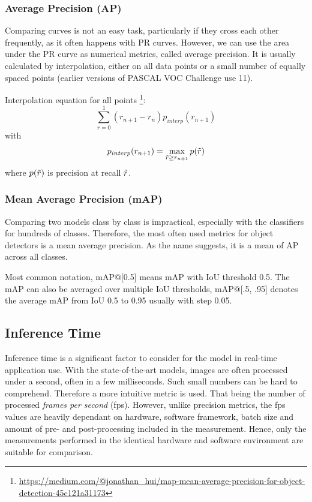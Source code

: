 \subsubsection{Average Precision (AP)}
Comparing curves is not an easy task, particularly if they cross each other frequently, as it often happens with PR curves. However, we can use the area under the PR curve as numerical metrics, called average precision. It is usually calculated by interpolation, either on all data points or a small number of equally spaced points (earlier versions of PASCAL VOC Challenge use 11).

Interpolation equation for all points \footnote{\url{https://medium.com/@jonathan\_hui/map-mean-average-precision-for-object-detection-45c121a31173}}:
$$\sum_{r=0}^1 (r_{n+1} - r_n ) p_{interp}(r_{n+1})$$
with
$$p_{interp}(r_{n+1}) = \max_{\Tilde{r} \geq r_{n+1}} p(\Tilde{r})$$
where $p(\Tilde{r})$ is precision at recall $\Tilde{r}$.

\subsubsection{Mean Average Precision (mAP)}
Comparing two models class by class is impractical, especially with the classifiers for hundreds of classes. Therefore, the most often used metrics for object detectors is a mean average precision. As the name suggests, it is a mean of AP across all classes.

Most common notation, mAP@[0.5] means mAP with IoU threshold 0.5. The mAP can also be averaged over multiple IoU thresholds, mAP@[.5, .95] denotes the average mAP from IoU 0.5 to 0.95 usually with step 0.05.

\subsection{Inference Time}
Inference time is a significant factor to consider for the model in real-time application use. With the state-of-the-art models, images are often processed under a second, often in a few milliseconds. Such small numbers can be hard to comprehend. Therefore a more intuitive metric is used. That being the number of processed \textit{frames per second} (fps). However, unlike precision metrics, the fps values are heavily dependant on hardware, software framework, batch size and amount of pre- and post-processing included in the measurement. Hence, only the measurements performed in the identical hardware and software environment are suitable for comparison.

